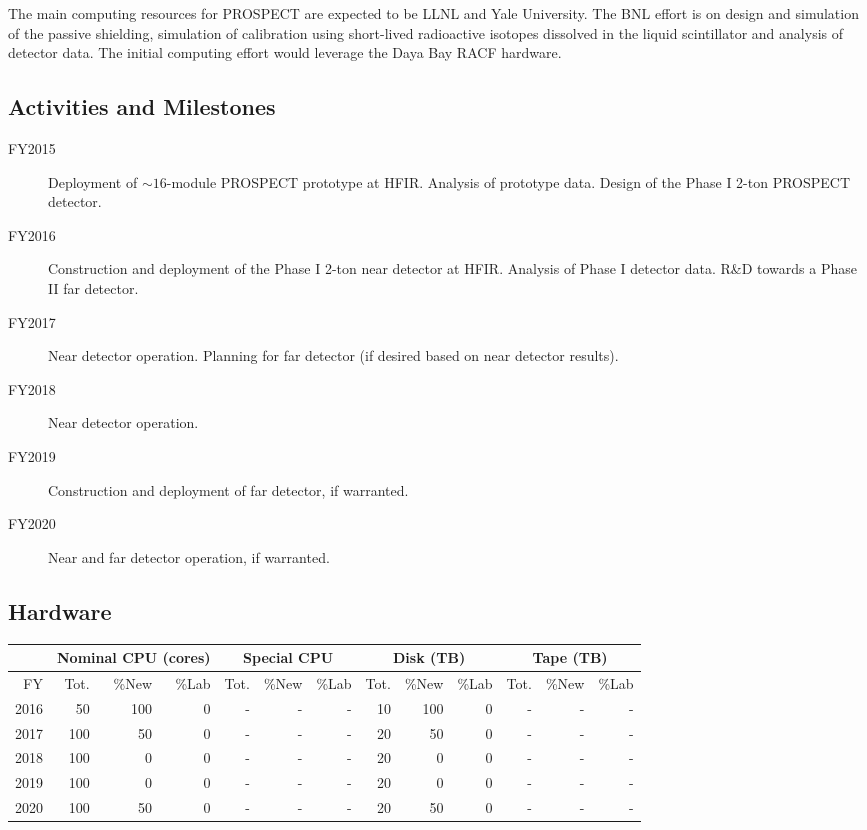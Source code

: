 \documentclass[pdftex,12pt,letter]{article}
\begin{document}
The main computing resources for PROSPECT are expected to be LLNL and
Yale University. 
The BNL effort is on design and simulation of the passive shielding,
simulation of calibration using short-lived radioactive isotopes
dissolved in the liquid scintillator and analysis of detector
data. The initial computing effort would leverage the Daya Bay RACF
hardware. 
\subsection{Activities and Milestones}

\begin{description}
\item[FY2015] Deployment of $\sim\!16$-module PROSPECT prototype at HFIR. 
				Analysis of prototype data. 
                Design of the Phase I 2-ton PROSPECT detector. 
\item[FY2016] Construction and deployment of the Phase I 2-ton near detector at HFIR.
				Analysis of Phase I detector data. R\&D towards a Phase II far detector.
\item[FY2017] Near detector operation. Planning for far detector (if desired based on near
			detector results).
\item[FY2018] Near detector operation. 
\item[FY2019] Construction and deployment of far detector, if warranted.
\item[FY2020] Near and far detector operation, if warranted.
\end{description}

\subsection{Hardware}

\begin{tabular}[h]{|r || r|r|r || r|r|r || r|r|r || r|r|r ||}
  \hline
   & \multicolumn{3}{c||}{Nominal CPU (cores)} & \multicolumn{3}{c||}{Special CPU} & \multicolumn{3}{c||}{Disk (TB)} & \multicolumn{3}{c||}{Tape (TB)} \\
   \hline
  FY & Tot. & \%New & \%Lab & Tot. & \%New & \%Lab & Tot. & \%New & \%Lab & Tot. & \%New & \%Lab \\
  \hline
  2016 & 50 &100 &0 &- &- &- & 10& 100&0 &- &- &- \\
  \hline
  2017 & 100& 50& 0&- &- &- & 20& 50&0 &- &- &-  \\
  \hline
  2018 & 100& 0& 0&- &- &- & 20& 0&0 &- &- &-  \\
  \hline
  2019 & 100& 0& 0&- &- &- & 20& 0&0 &- &- &-  \\
  \hline
  2020 & 100& 50& 0&- &- &- & 20& 50&0 &- &- &-  \\
  \hline
\end{tabular}
\end{document}
